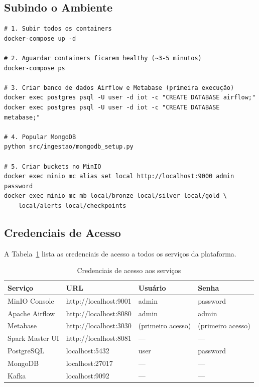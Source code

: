 \subsection{Subindo o Ambiente}

\begin{verbatim}
# 1. Subir todos os containers
docker-compose up -d

# 2. Aguardar containers ficarem healthy (~3-5 minutos)
docker-compose ps

# 3. Criar banco de dados Airflow e Metabase (primeira execução)
docker exec postgres psql -U user -d iot -c "CREATE DATABASE airflow;"
docker exec postgres psql -U user -d iot -c "CREATE DATABASE metabase;"

# 4. Popular MongoDB
python src/ingestao/mongodb_setup.py

# 5. Criar buckets no MinIO
docker exec minio mc alias set local http://localhost:9000 admin password
docker exec minio mc mb local/bronze local/silver local/gold \
    local/alerts local/checkpoints
\end{verbatim}

\subsection{Credenciais de Acesso}

A Tabela~\ref{tab:creds} lista as credenciais de acesso a todos os serviços da plataforma.

\begin{table}[h]
\centering
\caption{Credenciais de acesso aos serviços}
\label{tab:creds}
\begin{tabular}{|l|l|l|l|}
\hline
\textbf{Serviço} & \textbf{URL} & \textbf{Usuário} & \textbf{Senha} \\
\hline
MinIO Console & http://localhost:9001 & admin & password \\
\hline
Apache Airflow & http://localhost:8080 & admin & admin \\
\hline
Metabase & http://localhost:3030 & (primeiro acesso) & (primeiro acesso) \\
\hline
Spark Master UI & http://localhost:8081 & — & — \\
\hline
PostgreSQL & localhost:5432 & user & password \\
\hline
MongoDB & localhost:27017 & — & — \\
\hline
Kafka & localhost:9092 & — & — \\
\hline
\end{tabular}
\end{table}

